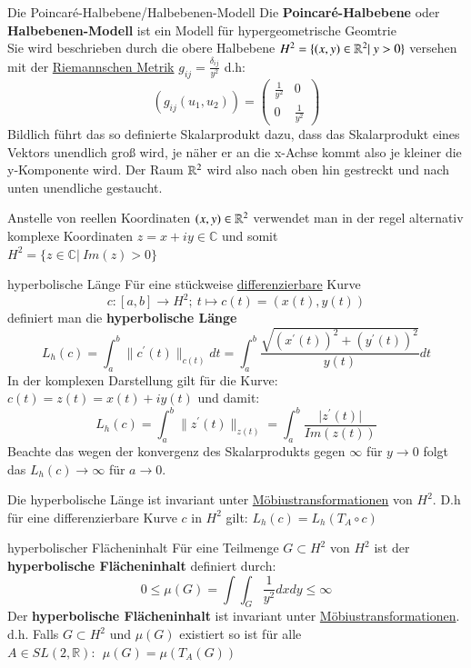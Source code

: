 \begin{titleDef}{Die Poincaré-Halbebene/Halbebenen-Modell}
\label{hyperbolischpoincare}
Die \textbf{Poincaré-Halbebene} oder \textbf{Halbebenen-Modell} ist ein Modell für hypergeometrische Geomtrie\\
Sie wird beschrieben durch die obere Halbebene $H^2=\{(x,y)\in\mathbb{R}^2|\ y>0\}$ versehen mit der \hyperref[riemannMetrik]{Riemannschen Metrik} $g_{ij}=\frac{\delta_{ij}}{y^2}$ d.h:
$$(g_{ij}(u_1,u_2))=\begin{pmatrix}
	\frac{1}{y^2}&0\\0&\frac{1}{y^2}
\end{pmatrix}
$$
Bildlich führt das so definierte Skalarprodukt dazu, dass das Skalarprodukt eines Vektors unendlich groß wird, je näher er an die x-Achse kommt also je kleiner die y-Komponente wird. Der Raum $\mathbb{R}^2$ wird also nach oben hin gestreckt und nach unten unendliche gestaucht.\par
Anstelle von reellen Koordinaten $(x,y)\in\mathbb{R}^2$ verwendet man in der regel alternativ komplexe Koordinaten $z=x+iy\in\mathbb{C}$ und somit\\ $H^2=\{z\in\mathbb{C}|\ Im(z)>0\}$
\end{titleDef}

\begin{titleDef}{hyperbolische Länge}
\label{hyperLaenge}
Für eine stückweise \hyperref[kurve]{differenzierbare} Kurve
$$c:[a,b]\to H^2;\: t\mapsto c(t)=(x(t),y(t))$$
definiert man die \textbf{hyperbolische Länge}
$$L_h(c)=\int_{a}^{b}\lVert c^\prime(t)\rVert_{c(t)} dt=\int_{a}^{b}\frac{\sqrt{(x^\prime(t))^2+(y^\prime(t))^2}}{y(t)}dt$$
In der komplexen Darstellung gilt für die Kurve: $c(t)=z(t)=x(t)+iy(t)$ und damit:
$$L_h(c)=\int_{a}^{b}\lVert z^\prime(t)\rVert_{z(t)}=\int_{a}^{b}\frac{\lvert z^\prime(t)\rvert}{Im(z(t))}$$
Beachte das wegen der konvergenz des Skalarprodukts gegen $\infty$ für $y\to 0$ folgt das $L_h(c)\to\infty$ für $a\to 0$.\par
Die hyperbolische Länge ist invariant unter \hyperref[moebiustrans]{Möbiustransformationen} von $H^2$. D.h für eine differenzierbare Kurve $c$ in $H^2$ gilt: $L_h(c)=L_h(T_A\circ c)$
\end{titleDef}

\begin{titleDef}{hyperbolischer Flächeninhalt}
\label{hyperFlaeche}
Für eine Teilmenge $G\subset H^2$ von $H^2$ ist der \textbf{hyperbolische Flächeninhalt} definiert durch:
$$0\leq\mu(G)=\int\int_{G}\frac{1}{y^2}dxdy\leq\infty$$
Der \textbf{hyperbolische Flächeninhalt} ist invariant unter \hyperref[moebiustrans]{Möbiustransformationen}.\\
d.h. Falls $G\subset H^2$ und $\mu(G)$ existiert so ist für alle $A\in SL(2,\mathbb{R}): \:\: \mu(G)=\mu(T_A(G))$ 
\end{titleDef}

